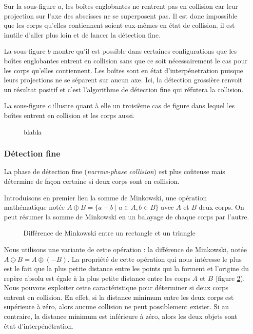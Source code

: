 Sur la sous-figure $a$, les boîtes englobantes ne rentrent pas en
collision car leur projection sur l'axe des abscisses ne se
superposent pas. Il est donc impossible que les corps qu'elles
contiennent soient eux-mêmes en état de collision, il est inutile
d'aller plus loin et de lancer la détection fine.

La sous-figure $b$ montre qu'il est possible dans certaines
configurations que les boîtes englobantes entrent en collision sans
que ce soit nécessairement le cas pour les corps qu'elles
contiennent. Les boîtes sont en état d'interpénetration puisque leurs
projections ne se séparent sur aucun axe. Ici, la détection grossière
renvoit un résultat positif et c'est l'algorithme de détection fine
qui réfutera la collision.

La sous-figure $c$ illustre quant à elle un troisième cas de figure
dans lequel les boîtes entrent en collision et les corps aussi.

\begin{figure}
  \centering
  \subfloat[]{  }
  \qquad
  \subfloat[]{  }
  \qquad
  \subfloat[]{  }
  \label{aabb}
  \caption{blabla}
\end{figure}

\subsubsection{Détection fine}

La phase de détection fine (\textit{narrow-phase collision}) est plus
coûteuse mais détermine de façon certaine si deux corps sont en
collision.

Introduisons en premier lieu la somme de Minkowski, une opération
mathématique notée $A \oplus B = \{a + b \mid a \in A, b \in B\}$ avec
$A$ et $B$ deux corps. On peut résumer la somme de Minkowski en un
balayage de chaque corps par l'autre.

\begin{figure}
  \centering
  \subfloat[]{  }
  \subfloat[]{  }
  \label{minkowski}
  \caption{Différence de Minkowski entre un rectangle et un triangle}
\end{figure}

Nous utilisons une variante de cette opération : la différence de
Minkowski, notée $A \ominus B = A \oplus (-B)$. La propriété de cette
opération qui nous intéresse le plus est le fait que la plus petite
distance entre les points qui la forment et l'origine du repère absolu
est égale à la plus petite distance entre les corps $A$ et $B$ (figure
\ref{minkowski}). Nous pouvons exploiter cette caractéristique pour
déterminer si deux corps entrent en collision. En effet, si la
distance minimum entre les deux corps est supérieure à zéro, alors
aucune collision ne peut possiblement exister. Si au contraire, la
distance minimum est inférieure à zéro, alors les deux objets sont
état d'interpénétration.

